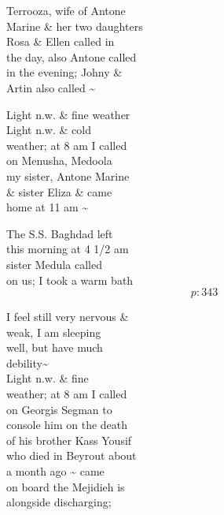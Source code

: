 \documentclass{report}
\begin{document}
	\par{
 	Terrooza, wife of Antone\ \\Marine \& her two daughters\ \\Rosa \& Ellen called in\ \\the day, also Antone called\ \\in the evening; Johny \&\ \\Artin also called \~{}\ \\
	}

	\par{
 	Light n.w. \& fine weather\ \\Light n.w. \& cold\ \\weather; at 8 am I called\ \\on Menusha, Medoola\ \\my sister, Antone Marine\ \\\& sister Eliza \& came\ \\home at 11 am \~{}\ \\
	}

	\par{
 	The S.S. Baghdad left\ \\this morning at 4 1/2 am\ \\sister Medula called\ \\on us; I took a warm bath\ \\
  \[p: 343 \]

	}




	\par{
 	I feel still very nervous \&\ \\weak, I am sleeping\ \\well, but have much\ \\debility\~{}\ \\Light n.w. \& fine\ \\weather; at 8 am I called\ \\on Georgis Segman to\ \\console him on the death\ \\of his brother Kass Yousif\ \\who died in Beyrout about\ \\a month ago \~{} came\ \\on board the Mejidieh is\ \\alongside discharging;\ \\
	}
\end{document}
